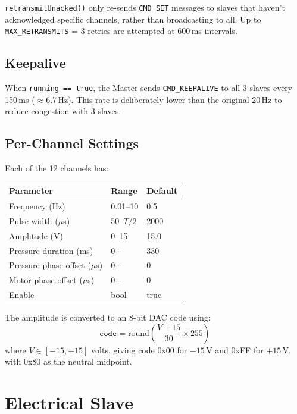 \documentclass[11pt,a4paper]{article}
\begin{document}
\texttt{retransmitUnacked()} only re-sends \texttt{CMD\_SET} messages to slaves
that haven't acknowledged specific channels, rather than broadcasting to all.
Up to \texttt{MAX\_RETRANSMITS} = 3 retries are attempted at 600\,ms intervals.

\subsection{Keepalive}

When \texttt{running == true}, the Master sends \texttt{CMD\_KEEPALIVE} to all
3 slaves every 150\,ms ($\approx$6.7\,Hz). This rate is deliberately lower
than the original 20\,Hz to reduce congestion with 3 slaves.

\subsection{Per-Channel Settings}

Each of the 12 channels has:

\begin{center}
\begin{tabular}{lll}
\toprule
\textbf{Parameter} & \textbf{Range} & \textbf{Default} \\
\midrule
Frequency (Hz)        & 0.01--10    & 0.5 \\
Pulse width ($\mu$s)  & 50--$T/2$  & 2000 \\
Amplitude (V)         & 0--15      & 15.0 \\
Pressure duration (ms) & 0+        & 330 \\
Pressure phase offset ($\mu$s) & 0+ & 0 \\
Motor phase offset ($\mu$s)    & 0+ & 0 \\
Enable                & bool       & true \\
\bottomrule
\end{tabular}
\end{center}

The amplitude is converted to an 8-bit DAC code using:
$$\texttt{code} = \text{round}\!\left(\frac{V + 15}{30} \times 255\right)$$
where $V \in [-15, +15]$ volts, giving code 0x00 for $-15$\,V and 0xFF for $+15$\,V, with 0x80 as the neutral midpoint.

\section{Electrical Slave}
\end{document}
